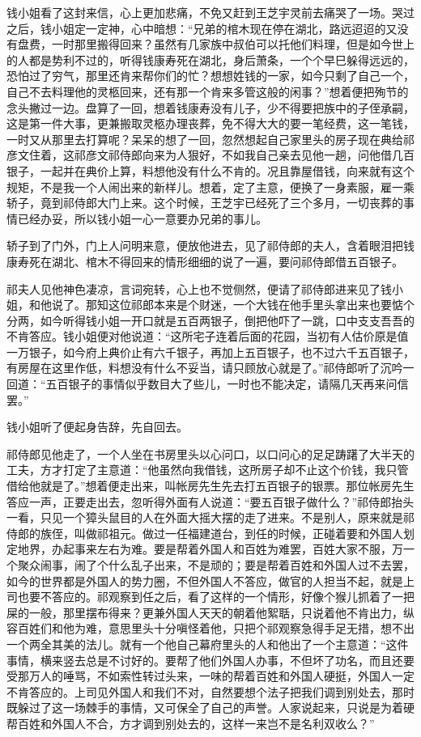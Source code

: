 \documentclass[12pt,UTF8]{ctexbook}
\begin{document}
{{{钱小姐看了这封来信，心上更加悲痛，不免又赶到王芝宇灵前去痛哭了一场。哭过之后，钱小姐定一定神，心中暗想：“兄弟的棺木现在停在湖北，路远迢迢的又没有盘费，一时那里搬得回来？虽然有几家族中叔伯可以托他们料理，但是如今世上的人都是势利不过的，听得钱康寿死在湖北，身后萧条，一个个早巳躲得远远的，恐怕过了穷气，那里还肯来帮你们的忙？想想姓钱的一家，如今只剩了自己一个，自己不去料理他的灵柩回来，还有那一个肯来多管这般的闲事？”想着便把殉节的念头撇过一边。盘算了一回，想着钱康寿没有儿子，少不得要把族中的子侄承嗣，这是第一件大事，更兼搬取灵柩办理丧葬，免不得大大的要一笔经费，这一笔钱，一时又从那里去打算呢？呆呆的想了一回，忽然想起自己家里头的房子现在典给祁彦文住着，这祁彦文祁侍郎向来为人狠好，不如我自己亲去见他一趟，问他借几百银子，一起并在典价上算，料想他没有什么不肯的。况且靠屋借钱，向来就有这个规矩，不是我一个人闹出来的新样儿。想着，定了主意，便换了一身素服，雇一乘轿子，竟到祁侍郎大门上来。这个时候，王芝宇已经死了三个多月，一切丧葬的事情已经办妥，所以钱小姐一心一意要办兄弟的事儿。

轿子到了门外，门上人问明来意，便放他进去，见了祁侍郎的夫人，含着眼泪把钱康寿死在湖北、棺木不得回来的情形细细的说了一遍，要问祁侍郎借五百银子。

祁夫人见他神色凄凉，言词宛转，心上也不觉侧然，便请了祁侍郎进来见了钱小姐，和他说了。那知这位祁郎本来是个财迷，一个大钱在他手里头拿出来也要惦个分两，如今听得钱小姐一开口就是五百两银子，倒把他吓了一跳，口中支支吾吾的不肯答应。钱小姐便对他说道：“这所宅子连着后面的花园，当初有人估价原是值一万银子，如今府上典价止有六千银子，再加上五百银子，也不过六千五百银子，有房屋在这里作低，料想没有什么不妥当，请只顾放心就是了。”祁侍郎听了沉吟一回道：“五百银子的事情似乎数目大了些儿，一时也不能决定，请隔几天再来问信罢。”

钱小姐听了便起身告辞，先自回去。

祁侍郎见他走了，一个人坐在书房里头以心问口，以口问心的足足踌躇了大半天的工夫，方才打定了主意道：“他虽然向我借钱，这所房子却不止这个价钱，我只管借给他就是了。”想着便走出来，叫帐房先生先去打五百银子的银票。那位帐房先生答应一声，正要走出去，忽听得外面有人说道：“要五百银子做什么？”祁侍郎抬头一看，只见一个獐头鼠目的人在外面大摇大摆的走了进来。不是别人，原来就是祁侍郎的族侄，叫做祁祖元。做过一任福建道台，到任的时候，正碰着要和外国人划定地界，办起事来左右为难。要是帮着外国人和百姓为难罢，百姓大家不服，万一个聚众闹事，闹了个什么乱子出来，不是顽的；要是帮着百姓和外国人过不去罢，如今的世界都是外国人的势力圈，不但外国人不答应，做官的人担当不起，就是上司也要不答应的。祁观察到任之后，看了这样的一个情形，好像个猴儿抓着了一把屎的一般，那里摆布得来？更兼外国人天天的朝着他絮聒，只说着他不肯出力，纵容百姓们和他为难，意思里头十分嗔怪着他，只把个祁观察急得手足无措，想不出一个两全其美的法儿。就有一个他自己幕府里头的人和他出了一个主意道：“这件事情，横来竖去总是不讨好的。要帮了他们外国人办事，不但坏了功名，而且还要受那万人的唾骂，不如索性转过头来，一味的帮着百姓和外国人硬挺，外国人一定不肯答应的。上司见外国人和我们不对，自然要想个法子把我们调到别处去，那时既躲过了这一场棘手的事情，又可保全了自己的声誉。人家说起来，只说是为着硬帮百姓和外国人不合，方才调到别处去的，这样一来岂不是名利双收么？”

}}}
\end{document}
